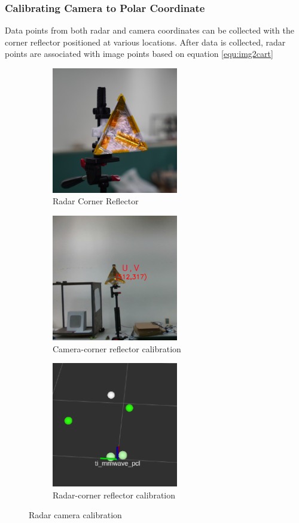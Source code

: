 \subsubsection{Calibrating Camera to Polar Coordinate}

Data points from both radar and camera coordinates can be collected with the corner reflector positioned at various locations.
After data is collected, radar points are associated with image points based on equation \ref*{equ:img2cart}
\begin{figure}[hbpt]
    \centering
    \begin{subfigure}{0.25\linewidth}
        \includegraphics[width=5.5cm]{Figures/corner_reflector.jpg}
        \caption{Radar Corner Reflector}
        \label{subfig:corner_reflector_fig}
    \end{subfigure}
    \hfill
    \begin{subfigure}{0.25\linewidth}
        \centering
        \includegraphics[width=5.5cm]{Figures/camera_corner.png}
        \caption{Camera-corner reflector calibration}
        \label{subfig:camera_view_fig}
    \end{subfigure}
    \hfill
    \begin{subfigure}{0.25\linewidth}
        \centering
        \includegraphics[width=5.5cm]{Figures/radar_corner.png}
        \caption{Radar-corner reflector calibration}
        \label{subfig:radar_view_fig}
    \end{subfigure}

    \caption{Radar camera calibration}
    \label{fig:radar_camera_calibration}
\end{figure}
